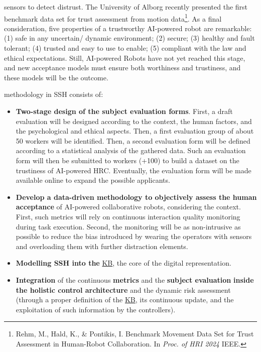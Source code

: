 sensors to detect distrust. The University of Alborg recently presented
the first benchmark data set for trust assessment from motion
data\footnote{Rehm, M., Hald, K., \& Pontikis, I. Benchmark Movement
  Data Set for Trust Assessment in Human-Robot Collaboration. In
  \emph{Proc. of HRI 2024} IEEE.}. As a final consideration, five
properties of a trustworthy AI-powered robot are remarkable: (1) safe in
any uncertain/ dynamic environment; (2) secure; (3) healthy and fault
tolerant; (4) trusted and easy to use to enable; (5) compliant with the
law and ethical expectations. Still, AI-powered Robots have not yet
reached this stage, and new acceptance models must ensure both
worthiness and trustiness, and these models will be the
 outcome.

 methodology in SSH consists of:

\begin{itemize}
\item
  \textbf{Two-stage design of the subject evaluation forms}. First, a
  draft evaluation will be designed according to the context, the human
  factors, and the psychological and ethical aspects. Then, a first
  evaluation group of about 50 workers will be identified. Then, a
  second evaluation form will be defined according to a statistical
  analysis of the gathered data. Such an evaluation form will then be
  submitted to workers (+100) to build a dataset on the trustiness of
  AI-powered HRC. Eventually, the evaluation form will be made available
  online to expand the possible applicants.
\item
  \textbf{Develop a data-driven methodology to objectively assess the
  human acceptance} of AI-powered collaborative robots, considering the
  context. First, such metrics will rely on continuous interaction
  quality monitoring during task execution. Second, the monitoring will
  be as non-intrusive as possible to reduce the bias introduced by
  wearing the operators with sensors and overloading them with further
  distraction elements.
\item
  \textbf{Modelling SSH into the} \ul{KB}, the core of the
   digital representation.
\item
  \textbf{Integration} of the continuous \textbf{metrics} and the
  \textbf{subject evaluation} \textbf{inside the holistic control
  architecture} and the dynamic risk assessment (through a proper
  definition of the \ul{KB}, its continuous update, and the exploitation
  of such information by the controllers).
\end{itemize}

